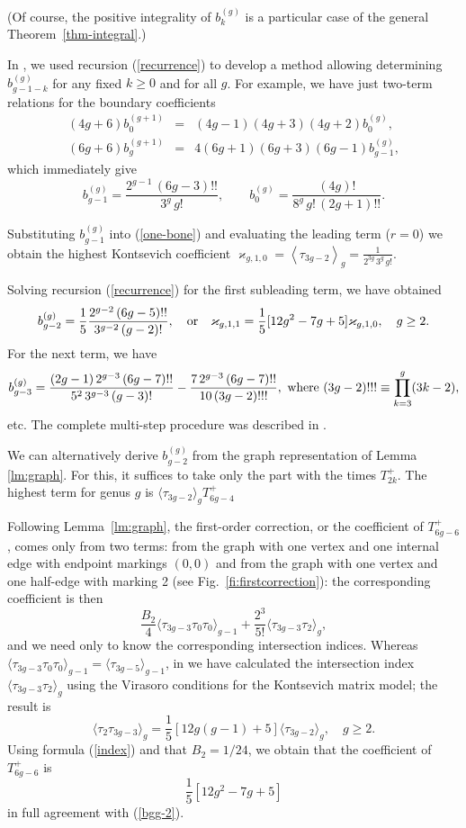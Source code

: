 \documentclass[11pt]{article}
\def\bea{\begin{eqnarray}}
\def\eea{\end{eqnarray}}
\def\<{\langle}
\def\>{\rangle}
\def\bea{\begin{eqnarray}}
\def\eea{\end{eqnarray}}
\def\beq{\begin{equation}}
\def\eeq{\end{equation}}
\theoremstyle{plain}
\theoremstyle{definition}
\def\beq{\begin{equation}}
\def\eeq{\end{equation}}
\def\bea{\begin{eqnarray}}
\def\eea{\end{eqnarray}}
\begin{document}
(Of course, the positive integrality of $b^{(g)}_k$ is a particular case of the general Theorem~\ref{thm-integral}.)

In \cite{ACNP}, we used recursion (\ref{recurrence}) to develop a method allowing determining $b^{(g)}_{g-1-k}$ for any fixed
$k\ge 0$ and for all $g$. For example, we have just two-term relations for the boundary coefficients 
\bea
(4g+6)b_0^{(g+1)}&=&(4g-1)(4g+3)(4g+2)b_0^{(g)},\nonumber\\
(6g+6)b_g^{(g+1)}&=&4(6g+1)(6g+3)(6g-1)b_{g-1}^{(g)},\nonumber
\eea
which immediately give
\beq
\label{b0-bg}
b_{g-1}^{(g)}=\frac{2^{g-1}\,(6g-3)!!}{3^g\, g!},\qquad b_{0}^{(g)}=\frac{(4g)!}{8^g\,g!\,(2g+1)!!}.
\eeq

Substituting
$b_{g-1}^{(g)}$ into (\ref{one-bone}) and evaluating the leading term ($r=0$) we obtain the
highest Kontsevich coefficient $\varkappa_{g,1,0}=\left\langle \tau_{3g-2}\right\rangle_g=\frac{1}{2^{3g}\,3^g\,g!}$. 

Solving recursion (\ref{recurrence}) for the first subleading term, we have obtained
\beq
b^{(g)}_{g-2}=\frac 15 \frac{2^{g-2}\,(6g-5)!!}{3^{g-2}\,(g-2)!}, \quad\hbox{or}\quad
\varkappa_{g,1,1}=\frac 15[12g^2-7g+5]\varkappa_{g,1,0},\quad g\ge 2.
\label{bgg-2}
\eeq
For the next term, we have
\beq
\label{b-g-3}
b^{(g)}_{g-3}=\frac{(2g-1)\,2^{g-3}\,(6g-7)!!}{5^2\,3^{g-3}\,(g-3)!}-\frac{7\,2^{g-3}\,(6g-7)!!}{10\,(3g-2)!!!},
\ \hbox{where}\ (3g-2)!!!\equiv \prod_{k=3}^g(3k-2),
\eeq
etc. The complete multi-step procedure was described in \cite{ACNP}.

We can alternatively derive $b^{(g)}_{g-2}$ from the graph representation of Lemma \ref{lm:graph}.
For this, it suffices to take only the part with the times $T^+_{2k}$. The highest term for genus $g$ is $\<\tau_{3g-2}\>_gT^+_{6g-4}$

Following Lemma~\ref{lm:graph}, the first-order
correction, or the coefficient of $T^+_{6g-6}$, comes only from two terms: from the graph with
one vertex and one internal edge with endpoint markings $(0,0)$ and from the graph with one vertex and one half-edge
with marking 2 (see Fig.~\ref{fi:firstcorrection}): the corresponding coefficient is then
\beq
\frac{B_2}{4}\<\tau_{3g-3}\tau_0\tau_0\>_{g-1}+\frac{2^3}{5!}\<\tau_{3g-3}\tau_2\>_g,
\label{bg-g-2-rec}
\eeq
and we need only to know the corresponding intersection indices. Whereas
$\<\tau_{3g-3}\tau_0\tau_0\>_{g-1}=\<\tau_{3g-5}\>_{g-1}$, in \cite{ACNP} we have calculated
the intersection index
$\<\tau_{3g-3}\tau_2\>_g$ using the Virasoro conditions for the Kontsevich matrix model; the result is
\beq
\<\tau_2\tau_{3g-3}\>_{g}=\frac15 [12g(g-1)+5]\<\tau_{3g-2}\>_g,\quad g\ge2.
\label{index}
\eeq
Using formula (\ref{index}) and that $B_2=1/24$, we obtain that the
coefficient of $T^{+}_{6g-6}$ is
\beq
\frac15 [12g^2-7g+5]
\label{coefficient}
\eeq
in full agreement with (\ref{bgg-2}).
\end{document}
